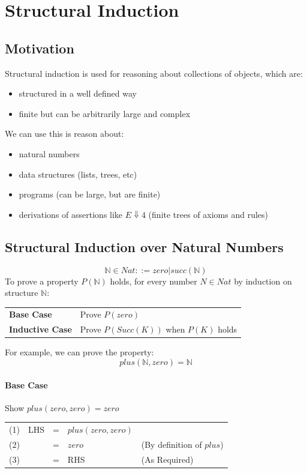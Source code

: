 \chapter{Structural Induction}
\section{Motivation}
Structural induction is used for reasoning about collections of objects, which are:
\begin{itemize}
    \item structured in a well defined way
    \item finite but can be arbitrarily large and complex
\end{itemize}

We can use this is reason about:
\begin{itemize}
	\item natural numbers
	\item data structures (lists, trees, etc)
	\item programs (can be large, but are finite)
	\item derivations of assertions like $E \Downarrow 4$ (finite trees of axioms and rules)
\end{itemize}

\section*{Structural Induction over Natural Numbers}
\[\mathbb{N} \in Nat ::= zero| succ(\mathbb{N})\]
To prove a property $P(\mathbb{N})$ holds, for every number $N \in Nat$ by induction on structure $\mathbb{N}$:
\begin{center}
    \begin{tabular}{l p{}}
        \textbf{Base Case} & Prove $P(zero)$ \\
        \textbf{Inductive Case} & Prove $P(Succ(K))$ when $P(K)$ holds \\
    \end{tabular}
\end{center}
For example, we can prove the property:
\[plus(\mathbb{N}, zero) = \mathbb{N}\]
\subsubsection*{Base Case}
Show $plus(zero, zero) = zero$
\begin{center}
    \begin{tabular}{c r c l l}
        (1) & LHS & = & $plus(zero, zero)$ &                           \\
        (2) &     & = & $zero$             & (By definition of $plus$) \\
        (3) &     & = & RHS                & (As Required)             \\
    \end{tabular}
\end{center}

